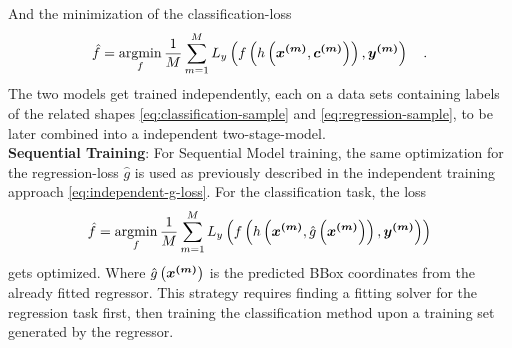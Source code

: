 And the minimization of the classification-loss
\begin{align}
    \hat{f} =
    \operatorname*{argmin}_{f}
    \frac{1}{M}
    \sum \limits_{m=1}^M
    L_y\left(
        f\left(
            h\left(
                \bm{x^{(m)}},
                \bm{c^{(m)}}
            \right)
        \right),
        \bm{y^{(m)}}
    \right) \quad .
\end{align}
The two models get trained independently, each on a data sets containing labels of the related shapes \eqref{eq:classification-sample} and \eqref{eq:regression-sample}, to be later combined into a independent two-stage-model.\\
\textbf{Sequential Training}:
For Sequential Model training, the same optimization for the regression-loss $\hat{g}$ is used as previously described in the independent training approach \eqref{eq:independent-g-loss}.
For the classification task, the loss
\begin{align}
    \hat{f} =
    \operatorname*{argmin}_{f}
    \frac{1}{M}
    \sum \limits_{m=1}^M L_y\left(
        f\left(
            h\left(
                \bm{x^{(m)}},
                \hat{g}\left(
                    \bm{x^{(m)}}
                \right)
            \right),
            \bm{y^{(m)}}
        \right)
    \right)
\end{align}
gets optimized.
Where $\hat{g}\left(\bm{x^{(m)}}\right)$ is the predicted BBox coordinates from the already fitted regressor.
This strategy requires finding a fitting solver for the regression task first, then training the classification method upon a training set generated by the regressor.

